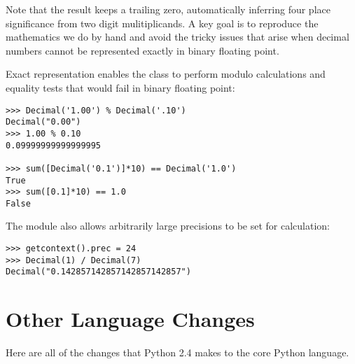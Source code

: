 \documentclass{howto}
\begin{document}
Note that the  result keeps a trailing zero, automatically
inferring four place significance from two digit mulitiplicands.  A key
goal is to reproduce the mathematics we do by hand and avoid the tricky
issues that arise when decimal numbers cannot be represented exactly in
binary floating point.

Exact representation enables the  class to perform
modulo calculations and equality tests that would fail in binary
floating point:

\begin{verbatim}
>>> Decimal('1.00') % Decimal('.10')
Decimal("0.00")
>>> 1.00 % 0.10
0.09999999999999995
       
>>> sum([Decimal('0.1')]*10) == Decimal('1.0')
True
>>> sum([0.1]*10) == 1.0
False      
\end{verbatim}

The  module also allows arbitrarily large precisions to be
set for calculation:

\begin{verbatim}
>>> getcontext().prec = 24
>>> Decimal(1) / Decimal(7)
Decimal("0.142857142857142857142857")
\end{verbatim}
       
\begin{seealso}
\end{seealso}      


\section{Other Language Changes}

Here are all of the changes that Python 2.4 makes to the core Python
language.
\end{document}
